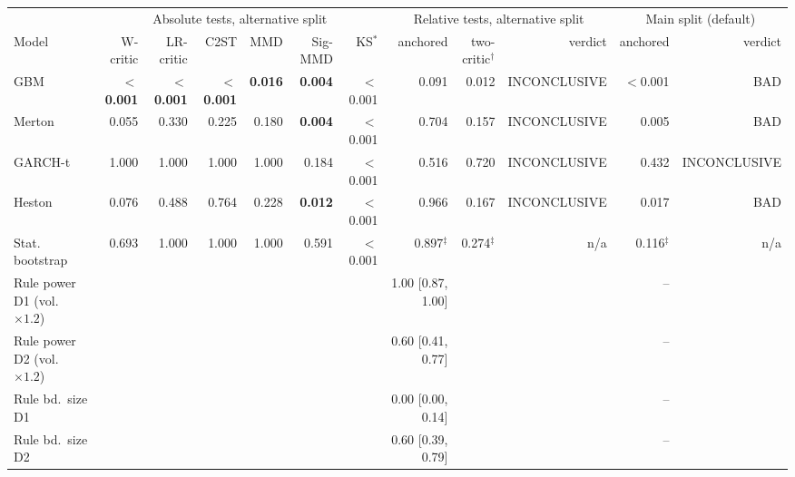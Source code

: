 \begin{tabular}{lrrrrrrrrrrr}
\toprule
 & \multicolumn{6}{c}{Absolute tests, alternative split} & \multicolumn{3}{c}{Relative tests, alternative split} & \multicolumn{2}{c}{Main split (default)} \\
\cmidrule(lr){2-7} \cmidrule(lr){8-10} \cmidrule(lr){11-12}
Model & W-critic & LR-critic & C2ST & MMD & Sig-MMD & KS$^\ast$ & anchored & two-critic$^\dagger$ & verdict & anchored & verdict \\
\midrule
GBM & \textbf{$<$0.001} & \textbf{$<$0.001} & \textbf{$<$0.001} & \textbf{0.016} & \textbf{0.004} & $<$0.001 & 0.091 & 0.012 & INCONCLUSIVE & $<$0.001 & BAD \\
Merton & 0.055 & 0.330 & 0.225 & 0.180 & \textbf{0.004} & $<$0.001 & 0.704 & 0.157 & INCONCLUSIVE & 0.005 & BAD \\
GARCH-t & 1.000 & 1.000 & 1.000 & 1.000 & 0.184 & $<$0.001 & 0.516 & 0.720 & INCONCLUSIVE & 0.432 & INCONCLUSIVE \\
Heston & 0.076 & 0.488 & 0.764 & 0.228 & \textbf{0.012} & $<$0.001 & 0.966 & 0.167 & INCONCLUSIVE & 0.017 & BAD \\
Stat. bootstrap & 0.693 & 1.000 & 1.000 & 1.000 & 0.591 & $<$0.001 & 0.897$^\ddagger$ & 0.274$^\ddagger$ & n/a & 0.116$^\ddagger$ & n/a \\
Rule power D1 (vol.\ $\times1.2$) &  &  &  &  &  &  & 1.00 [0.87, 1.00] &  &  & -- &  \\
Rule power D2 (vol.\ $\times1.2$) &  &  &  &  &  &  & 0.60 [0.41, 0.77] &  &  & -- &  \\
Rule bd.\ size D1 &  &  &  &  &  &  & 0.00 [0.00, 0.14] &  &  & -- &  \\
Rule bd.\ size D2 &  &  &  &  &  &  & 0.60 [0.39, 0.79] &  &  & -- &  \\
\bottomrule
\end{tabular}
